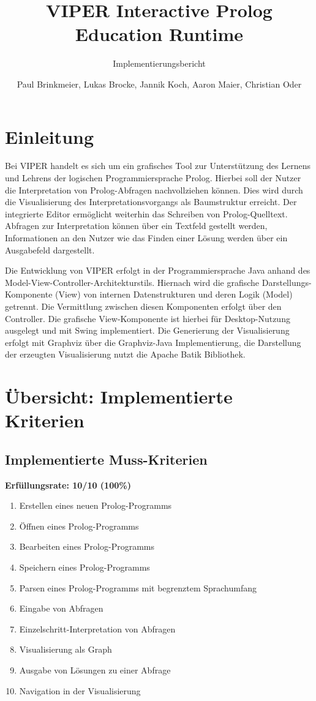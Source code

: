 \documentclass[parskip=full,11pt,twoside]{scrartcl}
\title{VIPER Interactive Prolog Education Runtime}
\subtitle{Implementierungsbericht}
\author{Paul Brinkmeier, Lukas Brocke, Jannik Koch, Aaron Maier, Christian Oder}
\newcommand{\cmark}{\ding{51}}%
\begin{document}
\maketitle
\tableofcontents

\section{Einleitung}
\setcounter{page}{1}

Bei VIPER handelt es sich um ein grafisches Tool zur Unterstützung des Lernens und Lehrens der logischen Programmiersprache Prolog. Hierbei soll der Nutzer die Interpretation von Prolog-Abfragen nachvollziehen können. Dies wird durch die Visualisierung des Interpretationsvorgangs als Baumstruktur erreicht. Der integrierte Editor ermöglicht weiterhin das Schreiben von Prolog-Quelltext. Abfragen zur Interpretation können über ein Textfeld gestellt werden, Informationen an den Nutzer wie das Finden einer Lösung werden über ein Ausgabefeld dargestellt.

Die Entwicklung von VIPER erfolgt in der Programmiersprache Java anhand des Model-View-Controller-Architekturstils. Hiernach wird die grafische Darstellungs-Komponente (View) von internen Datenstrukturen und deren Logik (Model) getrennt. Die Vermittlung zwischen diesen Komponenten erfolgt über den Controller. Die grafische View-Komponente ist hierbei für Desktop-Nutzung ausgelegt und mit Swing implementiert. Die Generierung der Visualisierung erfolgt mit Graphviz über die Graphviz-Java Implementierung, die Darstellung der erzeugten Visualisierung nutzt die Apache Batik Bibliothek.

\section{Übersicht: Implementierte Kriterien}

\subsection{Implementierte Muss-Kriterien}
	\textbf{Erfüllungsrate: 10/10 (100\%)}
	\begin{enumerate}[label=\textbf{M\arabic*}]
		\item Erstellen eines neuen Prolog-Programms\hfill\cmark
		\item Öffnen eines Prolog-Programms\hfill\cmark
		\item Bearbeiten eines Prolog-Programms\hfill\cmark
		\item Speichern eines Prolog-Programms\hfill\cmark
		\item Parsen eines Prolog-Programms mit begrenztem Sprachumfang\hfill\cmark
		\item Eingabe von Abfragen\hfill\cmark
		\item Einzelschritt-Interpretation von Abfragen\hfill\cmark
		\item Visualisierung als Graph\hfill\cmark
		\item Ausgabe von Lösungen zu einer Abfrage\hfill\cmark
		\item Navigation in der Visualisierung\hfill\cmark
	\end{enumerate}
\end{document}
